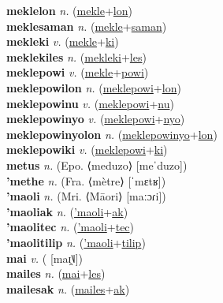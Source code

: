 \textbf{meklelon} \textit{n.} (\hyperref[mekle]{mekle}+\hyperref[lon]{lon})
 \label{meklelon} \\
\textbf{meklesaman} \textit{n.} (\hyperref[mekle]{mekle}+\hyperref[saman]{saman})
 \label{meklesaman} \\
\textbf{mekleki} \textit{v.} (\hyperref[mekle]{mekle}+\hyperref[ki]{ki})
 \label{mekleki} \\
\textbf{meklekiles} \textit{n.} (\hyperref[mekleki]{mekleki}+\hyperref[les]{les})
 \label{meklekiles} \\
\textbf{meklepowi} \textit{v.} (\hyperref[mekle]{mekle}+\hyperref[powi]{powi})
 \label{meklepowi} \\
\textbf{meklepowilon} \textit{n.} (\hyperref[meklepowi]{meklepowi}+\hyperref[lon]{lon})
 \label{meklepowilon} \\
\textbf{meklepowinu} \textit{v.} (\hyperref[meklepowi]{meklepowi}+\hyperref[nu]{nu})
 \label{meklepowinu} \\
\textbf{meklepowinyo} \textit{v.} (\hyperref[meklepowi]{meklepowi}+\hyperref[nyo]{nyo})
 \label{meklepowinyo} \\
\textbf{meklepowinyolon} \textit{n.} (\hyperref[meklepowinyo]{meklepowinyo}+\hyperref[lon]{lon})
 \label{meklepowinyolon} \\
\textbf{meklepowiki} \textit{v.} (\hyperref[meklepowi]{meklepowi}+\hyperref[ki]{ki})
 \label{meklepowiki} \\
\textbf{metus} \textit{n.} (Epo. ⟨meduzo⟩ [meˈduzo])
 \label{metus} \\
\textbf{'methe} \textit{n.} (Fra. ⟨mètre⟩ [ˈmɛtʁ])
 \label{'methe} \\
\textbf{'maoli} \textit{n.} (Mri. ⟨Māori⟩ [maːɔɾi])
 \label{'maoli} \\
\textbf{'maoliak} \textit{n.} (\hyperref['maoli]{'maoli}+\hyperref[ak]{ak})
 \label{'maoliak} \\
\textbf{'maolitec} \textit{n.} (\hyperref['maoli]{'maoli}+\hyperref[tec]{tec})
 \label{'maolitec} \\
\textbf{'maolitilip} \textit{n.} (\hyperref['maoli]{'maoli}+\hyperref[tilip]{tilip})
 \label{'maolitilip} \\
\textbf{mai} \textit{v.} ( [maɪ̯˥˩])
 \label{mai} \\
\textbf{mailes} \textit{n.} (\hyperref[mai]{mai}+\hyperref[les]{les})
 \label{mailes} \\
\textbf{mailesak} \textit{n.} (\hyperref[mailes]{mailes}+\hyperref[ak]{ak})
 \label{mailesak} \\
